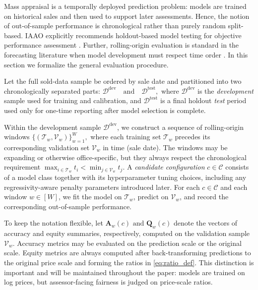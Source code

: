 \documentclass[12pt, draft]{article}
\theoremstyle{plain}
\theoremstyle{definition}
\newcommand{\1}{\mathbf{1}}
\newcommand{\D}{\mathcal{D}}
\begin{document}
Mass appraisal is a temporally deployed prediction problem: models are trained on historical sales and then used to support later assessments. Hence, the notion of out-of-sample performance is chronological rather than purely random split-based. IAAO explicitly recommends holdout-based model testing for objective performance assessment \cite{IAAO2025Mass}. Further, rolling-origin evaluation is standard in the forecasting literature when model development must respect time order \cite{tashman2000out}. In this section we formalize the general evaluation procedure.

Let the full sold-data sample be ordered by sale date and partitioned into two chronologically separated parts:
$
\mathcal{D}^{\mathrm{dev}}
\quad\text{and}\quad
\mathcal{D}^{\mathrm{test}},
$
where $\mathcal{D}^{\mathrm{dev}}$ is the \textit{development} sample used for training and calibration, and $\mathcal{D}^{\mathrm{test}}$ is a final holdout \textit{test} period used only for one-time reporting after model selection is complete. 

Within the development sample $\D^\mathrm{dev}$, we construct a sequence of rolling-origin windows 
$\{(\mathcal{T}_w,\mathcal{V}_w)\}_{w=1}^W,$
where each training set $\mathcal{T}_w$ precedes its corresponding validation set $\mathcal{V}_w$ in time (sale date). The windows may be expanding or otherwise office-specific, but they always respect the chronological requirement
$
\max_{i\in \mathcal{T}_w} t_i
<
\min_{j\in \mathcal{V}_w} t_j.
$
A \emph{candidate configuration} $c\in\mathcal{C}$ consists of a model class together with its hyperparameter tuning choices, including any regressivity-aware penalty parameters introduced later. For each $c\in\mathcal{C}$ and each window $w \in [W]$, we fit the model on $\mathcal{T}_w$, predict on $\mathcal{V}_w$, and record the corresponding out-of-sample performance.

To keep the notation flexible, let
$
\mathbf{A}_w(c)
\text{ and }
\mathbf{Q}_w(c)
$
denote the vectors of accuracy and equity summaries, respectively, computed on the validation sample $\mathcal{V}_w$. Accuracy metrics may be evaluated on the prediction scale or the original scale. Equity metrics are always computed after back-transforming predictions to the original price scale and forming the ratios in \eqref{eq:ratio_def}. This distinction is important and will be maintained throughout the paper: models are trained on log prices, but assessor-facing fairness is judged on price-scale ratios.
\end{document}
